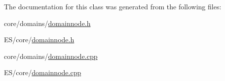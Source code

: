 The documentation for this class was generated from the following files:\begin{DoxyCompactItemize}
\item 
core/domains/\hyperlink{core_2domains_2domainnode_8h}{domainnode.h}\item 
ES/core/\hyperlink{_e_s_2core_2domainnode_8h}{domainnode.h}\item 
core/domains/\hyperlink{core_2domains_2domainnode_8cpp}{domainnode.cpp}\item 
ES/core/\hyperlink{_e_s_2core_2domainnode_8cpp}{domainnode.cpp}\end{DoxyCompactItemize}
